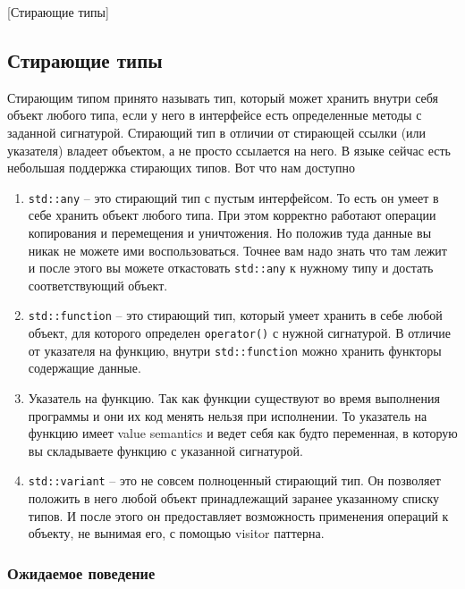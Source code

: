 [Стирающие типы]


\subsection{Стирающие типы}
\label{section::TypeErasure}

Стирающим типом принято называть тип, который может хранить внутри себя объект любого типа, если у него в интерфейсе есть определенные методы с заданной сигнатурой.
Стирающий тип в отличии от стирающей ссылки (или указателя) владеет объектом, а не просто ссылается на него.
В языке сейчас есть небольшая поддержка стирающих типов.
Вот что нам доступно
\begin{enumerate}
\item \verb"std::any" -- это стирающий тип с пустым интерфейсом.
То есть он умеет в себе хранить объект любого типа.
При этом корректно работают операции копирования и перемещения и уничтожения.
Но положив туда данные вы никак не можете ими воспользоваться.
Точнее вам надо знать что там лежит и после этого вы можете откастовать \verb"std::any" к нужному типу и достать соответствующий объект.

\item \verb"std::function" -- это стирающий тип, который умеет хранить в себе любой объект, для которого определен \verb"operator()" с нужной сигнатурой.
В отличие от указателя на функцию, внутри \verb"std::function" можно хранить функторы содержащие данные.

\item Указатель на функцию.
Так как функции существуют во время выполнения программы и они их код менять нельзя при исполнении.
То указатель на функцию имеет value semantics и ведет себя как будто переменная, в которую вы складываете функцию с указанной сигнатурой.

\item \verb"std::variant" -- это не совсем полноценный стирающий тип.
Он позволяет положить в него любой объект принадлежащий заранее указанному списку типов.
И после этого он предоставляет возможность применения операций к объекту, не вынимая его, с помощью visitor паттерна.
\end{enumerate}

\subsubsection{Ожидаемое поведение}

